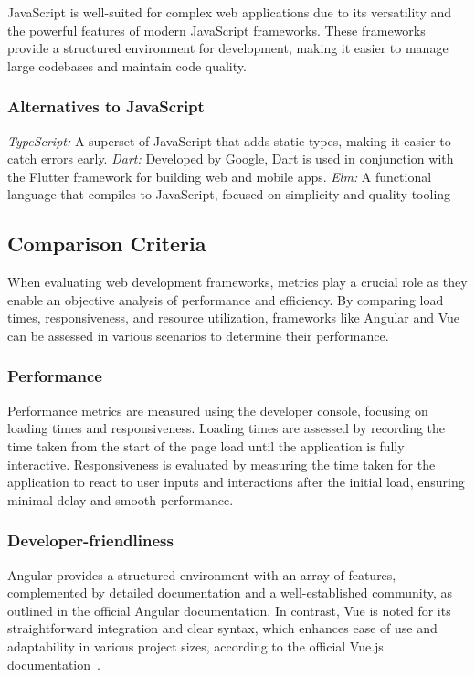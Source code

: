 \documentclass[conference]{IEEEtran}
\begin{document}
JavaScript is well-suited for complex web applications due to its versatility and the powerful features of modern JavaScript frameworks. These frameworks provide a structured environment for development, making it easier to manage large codebases and maintain code quality.

\subsubsection{Alternatives to JavaScript}

\textit{TypeScript:} A superset of JavaScript that adds static types, making it easier to catch errors early.
\newline\textit{Dart:} Developed by Google, Dart is used in conjunction with the Flutter framework for building web and mobile apps.
\newline\textit{Elm:} A functional language that compiles to JavaScript, focused on simplicity and quality tooling~\cite{mdn-js-guide}

\subsection {Comparison Criteria}

When evaluating web development frameworks, metrics play a crucial role as they enable an objective analysis of performance and efficiency. By comparing load times, responsiveness, and resource utilization, frameworks like Angular and Vue can be assessed in various scenarios to determine their performance.

\subsubsection{Performance}
Performance metrics are measured using the developer console, focusing on loading times and responsiveness. Loading times are assessed by recording the time taken from the start of the page load until the application is fully interactive. Responsiveness is evaluated by measuring the time taken for the application to react to user inputs and interactions after the initial load, ensuring minimal delay and smooth performance.
\subsubsection{Developer-friendliness}
Angular provides a structured environment with an array of features, complemented by detailed documentation and a well-established community, as outlined in the official Angular documentation. In contrast, Vue is noted for its straightforward integration and clear syntax, which enhances ease of use and adaptability in various project sizes, according to the official Vue.js documentation~\cite{angular, vue}.
\end{document}
